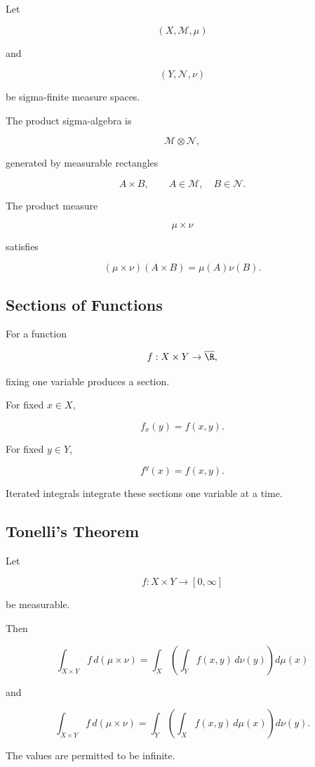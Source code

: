 Let

\[
(X,\mathcal{M},\mu)
\]

and

\[
(Y,\mathcal{N},\nu)
\]

be sigma-finite measure spaces.

The product sigma-algebra is

\[
\boxed{
\mathcal{M}\otimes\mathcal{N},
}
\]

generated by measurable rectangles

\[
A\times B,
\qquad
A\in\mathcal{M},
\quad
B\in\mathcal{N}.
\]

The product measure

\[
\mu\times\nu
\]

satisfies

\[
\boxed{
(\mu\times\nu)(A\times B)
=
\mu(A)\nu(B).
}
\]

\subsection{Sections of Functions}
\label{subsec:function-sections}

For a function

\[
f:X\times Y\to\overline{\R},
\]

fixing one variable produces a section.

For fixed \(x\in X\),

\[
\boxed{
f_x(y)=f(x,y).
}
\]

For fixed \(y\in Y\),

\[
\boxed{
f^y(x)=f(x,y).
}
\]

Iterated integrals integrate these sections one variable at a time.

\subsection{Tonelli's Theorem}
\label{subsec:tonellis-theorem}

\begin{theorem}
Let

\[
f:X\times Y\to[0,\infty]
\]

be measurable.

Then

\[
\boxed{
\int_{X\times Y}
f\,d(\mu\times\nu)
=
\int_X
\left(
\int_Yf(x,y)\,d\nu(y)
\right)
d\mu(x)
}
\]

and

\[
\boxed{
\int_{X\times Y}
f\,d(\mu\times\nu)
=
\int_Y
\left(
\int_Xf(x,y)\,d\mu(x)
\right)
d\nu(y).
}
\]

The values are permitted to be infinite.
\end{theorem}

